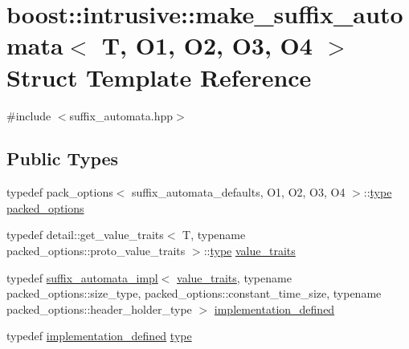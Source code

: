 \hypertarget{structboost_1_1intrusive_1_1make__suffix__automata}{}\section{boost\+:\+:intrusive\+:\+:make\+\_\+suffix\+\_\+automata$<$ T, O1, O2, O3, O4 $>$ Struct Template Reference}
\label{structboost_1_1intrusive_1_1make__suffix__automata}


{\ttfamily \#include $<$suffix\+\_\+automata.\+hpp$>$}

\subsection*{Public Types}
\begin{DoxyCompactItemize}
\item 
typedef pack\+\_\+options$<$ suffix\+\_\+automata\+\_\+defaults, O1, O2, O3, O4 $>$\+::\hyperlink{structboost_1_1intrusive_1_1make__suffix__automata_a9b173abd26090bafc9d89d6ba31b4165}{type} \hyperlink{structboost_1_1intrusive_1_1make__suffix__automata_a33c2a1d1a4da2d12cb62017e1b8a86ae}{packed\+\_\+options}
\item 
typedef detail\+::get\+\_\+value\+\_\+traits$<$ T, typename packed\+\_\+options\+::proto\+\_\+value\+\_\+traits $>$\+::\hyperlink{structboost_1_1intrusive_1_1make__suffix__automata_a9b173abd26090bafc9d89d6ba31b4165}{type} \hyperlink{structboost_1_1intrusive_1_1make__suffix__automata_a167b4c7e5a6fb43ca4238d252d8e823b}{value\+\_\+traits}
\item 
typedef \hyperlink{classboost_1_1intrusive_1_1suffix__automata__impl}{suffix\+\_\+automata\+\_\+impl}$<$ \hyperlink{structboost_1_1intrusive_1_1make__suffix__automata_a167b4c7e5a6fb43ca4238d252d8e823b}{value\+\_\+traits}, typename packed\+\_\+options\+::size\+\_\+type, packed\+\_\+options\+::constant\+\_\+time\+\_\+size, typename packed\+\_\+options\+::header\+\_\+holder\+\_\+type $>$ \hyperlink{structboost_1_1intrusive_1_1make__suffix__automata_a7c449bd4e565f9b3bcdea384f96b6bd6}{implementation\+\_\+defined}
\item 
typedef \hyperlink{structboost_1_1intrusive_1_1make__suffix__automata_a7c449bd4e565f9b3bcdea384f96b6bd6}{implementation\+\_\+defined} \hyperlink{structboost_1_1intrusive_1_1make__suffix__automata_a9b173abd26090bafc9d89d6ba31b4165}{type}
\end{DoxyCompactItemize}


